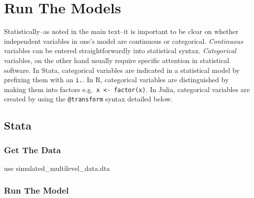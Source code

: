 \documentclass[
  letterpaper,
  DIV=11,
  numbers=noendperiod]{scrreprt}
\newenvironment{Shaded}{\begin{snugshade}}{\end{snugshade}}
\newcommand{\KeywordTok}[1]{\textcolor[rgb]{0.00,0.23,0.31}{#1}}
\newcommand{\NormalTok}[1]{\textcolor[rgb]{0.00,0.23,0.31}{#1}}
\begin{document}
\section{Run The Models}\label{run-the-models}

\begin{tcolorbox}[enhanced jigsaw, rightrule=.15mm, arc=.35mm, colframe=quarto-callout-warning-color-frame, title=\textcolor{quarto-callout-warning-color}{\faExclamationTriangle}\hspace{0.5em}{Continuous and Categorical Variables}, bottomrule=.15mm, colback=white, colbacktitle=quarto-callout-warning-color!10!white, toptitle=1mm, left=2mm, titlerule=0mm, leftrule=.75mm, toprule=.15mm, opacitybacktitle=0.6, bottomtitle=1mm, coltitle=black, breakable, opacityback=0]

Statistically--as noted in the main text--it is important to be clear on
whether independent variables in one's model are continuous or
categorical. \emph{Continuous} variables can be entered
straightforwardly into statistical syntax. \emph{Categorical} variables,
on the other hand usually require specific attention in statistical
software. In Stata, categorical variables are indicated in a statistical
model by prefixing them with an \texttt{i.}. In R, categorical variables
are distinguished by making them into factors
e.g.~\texttt{x\ \textless{}-\ factor(x)}. In Julia, categorical
variables are created by using the \texttt{@transform} syntax detailed
below.

\end{tcolorbox}

\subsection{Stata}

\subsubsection{Get The Data}\label{get-the-data}

\begin{Shaded}
\begin{Highlighting}[]

\KeywordTok{use}\NormalTok{ simulated\_multilevel\_data.dta}
\end{Highlighting}
\end{Shaded}

\subsubsection{Run The Model}\label{run-the-model}
\end{document}
